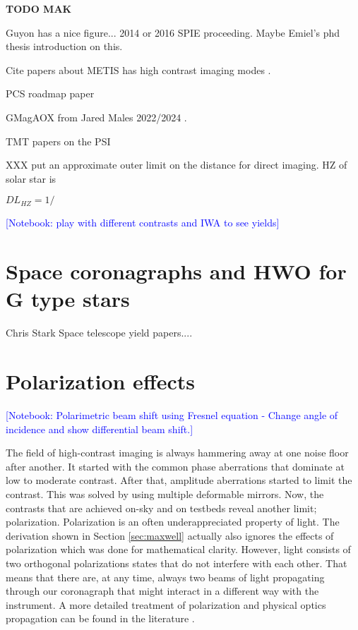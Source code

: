 \documentclass[letterpaper]{ar-1col}
\newcommand{\notebooksuggestion}[1]{\textcolor{blue}{[Notebook: #1]}}
\begin{document}
{\bf TODO MAK}

Guyon has a nice figure... 2014 or 2016 SPIE proceeding. Maybe Emiel's phd thesis introduction on this.

Cite papers about METIS \citep{Brandl21} has high contrast imaging modes \citep{Kenworthy16,Carlomagno20}.

PCS roadmap paper \citep{Kasper21}

GMagAOX from Jared Males 2022/2024 \citep{Males22}.

TMT papers on the PSI \citet{Jensen-Clem22,Fitzgerald22}


XXX put an approximate outer limit on the distance for direct imaging. HZ of solar star is 

$DL_{HZ} = 1/$

\notebooksuggestion{play with different contrasts and IWA to see yields}


\section{Space coronagraphs and HWO for G type stars}

Chris Stark Space telescope yield papers...\citep{Stark14,Stark24}.

\lipsum[2-4]



\section{Polarization effects} 

\notebooksuggestion{Polarimetric beam shift using Fresnel equation - Change angle of incidence and show differential beam shift.}

The field of high-contrast imaging is always hammering away at one noise floor after another. It started with the common phase aberrations that dominate at low to moderate contrast. After that, amplitude aberrations started to limit the contrast. This was solved by using multiple deformable mirrors. Now, the contrasts that are achieved on-sky and on testbeds reveal another limit; polarization. Polarization is an often underappreciated property of light. The derivation shown in Section \ref{sec:maxwell} actually also ignores the effects of polarization which was done for mathematical clarity. However, light consists of two orthogonal polarizations states that do not interfere with each other. That means that there are, at any time, always two beams of light propagating through our coronagraph that might interact in a different way with the instrument. A more detailed treatment of polarization and physical optics propagation can be found in the literature \citep{McLeod14}.
\end{document}
